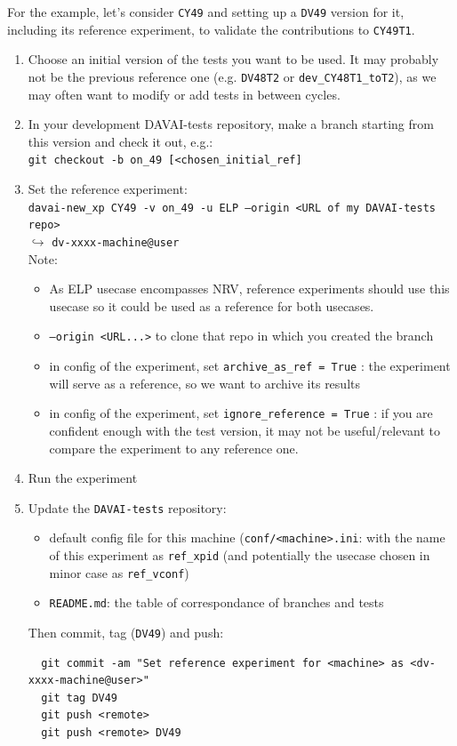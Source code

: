 \documentclass[a4paper,10pt,twoside]{article}
\begin{document}
\begin{appendix}
For the example, let's consider \texttt{CY49} and setting up a \texttt{DV49} version for it, including its reference experiment, to validate the contributions to \texttt{CY49T1}.
\begin{enumerate}[label=\arabic*),start=0]
 \item Choose an initial version of the tests you want to be used. It may probably not be the previous reference one (e.g. \texttt{DV48T2} or \texttt{dev\_CY48T1\_toT2}), as we may often want to modify or add tests in between cycles.
 \item In your development DAVAI-tests repository, make a branch starting from this version and check it out, e.g.:\\
 \texttt{git checkout -b on\_49 [<chosen\_initial\_ref]}
 \item Set the reference experiment:\\
 \texttt{davai-new\_xp CY49 -v on\_49 -u ELP --origin <URL of my DAVAI-tests repo>}\\
 $\hookrightarrow$ \texttt{dv-xxxx-machine@user}\\
 Note:
 \begin{itemize}
  \item As ELP usecase encompasses NRV, reference experiments should use this usecase so it could be used as a reference for both usecases.
  \item \texttt{--origin <URL...>} to clone that repo in which you created the branch
  \item in config of the experiment, set \texttt{archive\_as\_ref = True} : the experiment will serve as a reference, so we want to archive its results
  \item in config of the experiment, set \texttt{ignore\_reference = True} : if you are confident enough with the test version, it may not be useful/relevant to compare the experiment to any reference one.
 \end{itemize}
 \item Run the experiment
 \item Update the \texttt{DAVAI-tests} repository:
 \begin{itemize}
  \item default config file for this machine (\texttt{conf/<machine>.ini}: with the name of this experiment as \texttt{ref\_xpid} (and potentially the usecase chosen in minor case as \texttt{ref\_vconf})
  \item \texttt{README.md}: the table of correspondance of branches and tests
 \end{itemize}
 Then commit, tag (\texttt{DV49}) and push:
 \begin{verbatim}
  git commit -am "Set reference experiment for <machine> as <dv-xxxx-machine@user>"
  git tag DV49
  git push <remote>
  git push <remote> DV49
 \end{verbatim}
\end{enumerate}


\end{appendix}
\end{document}
